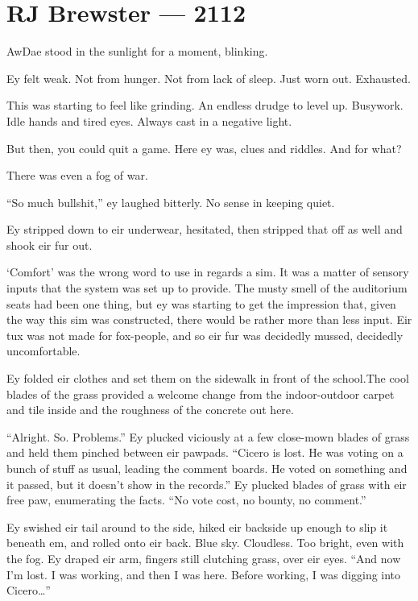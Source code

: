 \hypertarget{rj-brewster-2112}{%
\chapter*{RJ Brewster — 2112}\label{rj-brewster-2112}}

AwDae stood in the sunlight for a moment, blinking.

Ey felt weak. Not from hunger. Not from lack of sleep. Just worn out. Exhausted.

This was starting to feel like grinding. An endless drudge to level up. Busywork. Idle hands and tired eyes. Always cast in a negative light.

But then, you could quit a game. Here ey was, clues and riddles. And for what?

There was even a fog of war.

``So much bullshit,'' ey laughed bitterly. No sense in keeping quiet.

Ey stripped down to eir underwear, hesitated, then stripped that off as well and shook eir fur out.

`Comfort' was the wrong word to use in regards a sim. It was a matter of sensory inputs that the system was set up to provide. The musty smell of the auditorium seats had been one thing, but ey was starting to get the impression that, given the way this sim was constructed, there would be rather more than less input. Eir tux was not made for fox-people, and so eir fur was decidedly mussed, decidedly uncomfortable.

Ey folded eir clothes and set them on the sidewalk in front of the school.The cool blades of the grass provided a welcome change from the indoor-outdoor carpet and tile inside and the roughness of the concrete out here.

``Alright. So. Problems.'' Ey plucked viciously at a few close-mown blades of grass and held them pinched between eir pawpads. ``Cicero is lost. He was voting on a bunch of stuff as usual, leading the comment boards. He voted on something and it passed, but it doesn't show in the records.'' Ey plucked blades of grass with eir free paw, enumerating the facts. ``No vote cost, no bounty, no comment.''

Ey swished eir tail around to the side, hiked eir backside up enough to slip it beneath em, and rolled onto eir back. Blue sky. Cloudless. Too bright, even with the fog. Ey draped eir arm, fingers still clutching grass, over eir eyes. ``And now I'm lost. I was working, and then I was here. Before working, I was digging into Cicero\ldots{}''

